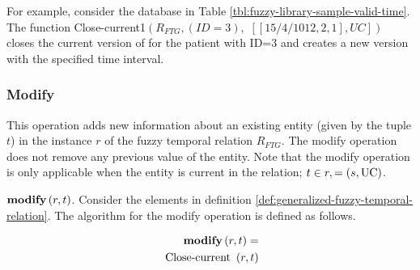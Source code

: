 

For example, consider the database in Table  \ref{tbl:fuzzy-library-sample-valid-time}. The function Close-current1$\left(R_{FTG}, \left(ID=3\right) \right.,$ $\left. \left[ \left[15/4/1012,2,1\right], UC\right]\right)$ closes the current version of for the patient with ID=3 and creates a new version with the specified time interval.

\subsubsection{\label{subsubsec:modify-fuzzy-temporal}Modify}
This operation adds new information about an existing entity (given by the tuple $t$) in the instance $r$ of the fuzzy temporal relation $R_{FTG}$. The modify operation does not remove any previous value of the entity.
Note that the modify operation is only applicable when the entity is current in the relation; $ t \in r,  = \left(s, \operatorname{UC} \right)$.

\begin{definition}
\emph{$\mbox{\textbf{modify}} \left( r, t \right)$}. 
Consider the elements in definition \ref{def:generalized-fuzzy-temporal-relation}. The algorithm for the modify operation is defined as follows.
\end{definition}


\begin{align}
\label{eq:modify-fuzzy-temporal}
\mbox{\textbf{modify}} \left( r, t\right) =\\
\nonumber
\mbox{ Close-current }\left(r, t \right) 
\end{align}

